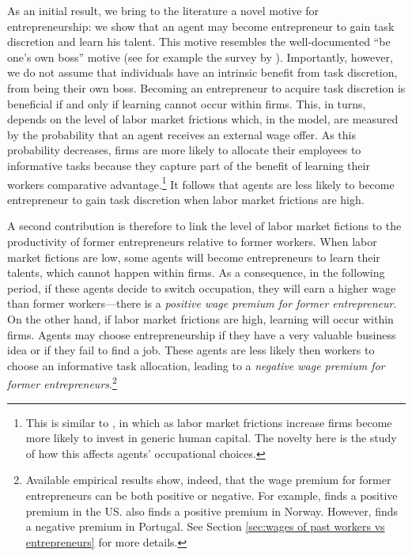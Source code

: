 \documentclass[12pt,american]{paper}
\theoremstyle{remark}
\begin{document}
As an initial result, we bring to the literature a novel motive for entrepreneurship: we show that an agent may become entrepreneur to gain task discretion and learn his talent. This motive resembles the  well-documented ``be one's own boss'' motive  (see for example the survey by \citealp{stephan2015understanding}). Importantly, however, we do not assume that individuals have an intrinsic benefit from task discretion, from being their own boss. Becoming an entrepreneur to acquire task discretion is beneficial if and only if learning cannot occur within firms. This, in turns, depends on the level of labor market frictions which, in the model, are measured by the  probability that an agent receives an external wage offer. As this probability decreases, firms are more likely to allocate their  employees to informative tasks because they capture part of the benefit of learning their workers comparative advantage.\footnote{This is similar to  \cite{acemoglu1999structure}, in which as labor market frictions increase firms become more likely to invest in generic human capital. The novelty here is the study of how this affects agents' occupational choices.} It follows that agents are less likely to become entrepreneur to gain task discretion when labor market frictions are high.

A second contribution is therefore to link the level of labor market fictions to the productivity of former entrepreneurs relative to former workers. When labor market fictions are low, some agents will become entrepreneurs to learn their talents, which cannot happen within firms. As a consequence, in the following period, if these agents decide to switch occupation, they will earn a higher wage than former workers---there is a \textit{positive wage premium for former entrepreneur}. On the other hand, if labor market frictions are high, learning will occur within firms. Agents may choose entrepreneurship if they have a very valuable business idea or if they fail to find a job. These agents are less likely then workers to choose an informative task allocation, leading to a \textit{negative wage premium for former entrepreneurs}.\footnote{Available empirical results show, indeed,  that the wage premium for former entrepreneurs can be both positive or negative. For example, \cite{hamilton2000does} finds a positive premium in the US. \cite{luzzi2016individual} also finds a positive premium in Norway. However, \cite*{baptista2012former} finds a negative premium in Portugal. See Section \ref{sec:wages of past workers vs entrepreneurs} for more details.}
\end{document}

